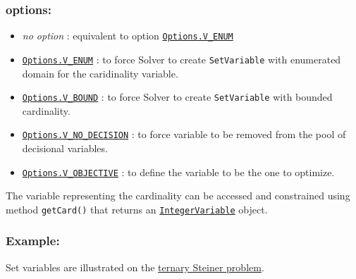 \subsubsection{options:}
	\begin{itemize}
		\item \emph{no option} : equivalent to option \hyperlink{venum:venumoptions}{\tt Options.V\_ENUM}
		\item \hyperlink{venum:venumoptions}{\tt Options.V\_ENUM} : to force Solver to create \texttt{SetVariable} with enumerated domain for the caridinality variable.
		\item \hyperlink{vbound:vboundoptions}{\tt Options.V\_BOUND} : to force Solver to create \texttt{SetVariable} with bounded cardinality.
		\item \hyperlink{vnodecision:vnodecisionoptions}{\tt Options.V\_NO\_DECISION} : to force variable to be removed from the pool of decisional variables.
		\item \hyperlink{vobjective:vobjectiveoptions}{\tt Options.V\_OBJECTIVE} : to define the variable to be the one to optimize.
	\end{itemize}

The variable representing the cardinality can be accessed and constrained using method \texttt{getCard()} that returns an \hyperlink{integervariable}{\tt IntegerVariable} object.

\subsubsection{Example:}


Set variables are illustrated on the \hyperlink{model:example2:ternarysteinerchoco}{ternary Steiner problem}. 


